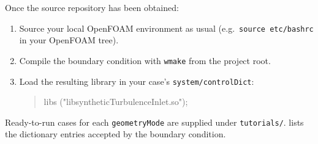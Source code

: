 \documentclass[
 amsmath,amssymb,
 aps,
 twocolumn,
]{revtex4-2}
\begin{document}
Once the source repository has been obtained:
\begin{enumerate}[noitemsep]
  \item Source your local OpenFOAM environment as usual
    (e.g.\ \texttt{source etc/bashrc} in your OpenFOAM tree).
  \item Compile the boundary condition with \texttt{wmake} from the
    project root.
  \item Load the resulting library in your case's
    \texttt{system/controlDict}:
\begin{quote}\ttfamily\small
libs ("libsyntheticTurbulenceInlet.so");
\end{quote}
\end{enumerate}
Ready-to-run cases for each \texttt{geometryMode} are supplied under
\texttt{tutorials/}.
 lists the dictionary entries accepted by the boundary
condition. 
\end{document}
